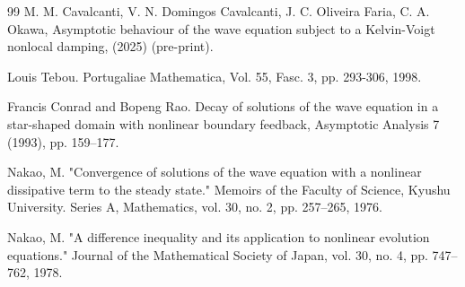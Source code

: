 \documentclass[11pt,reqno]{amsart}
\theoremstyle{remark}
\begin{document}
\begin{thebibliography}{99}
 M. M. Cavalcanti, V. N. Domingos Cavalcanti, J. C. Oliveira Faria, C. A. Okawa, Asymptotic behaviour of the wave equation subject to a Kelvin-Voigt nonlocal damping, (2025) (pre-print).

 Louis Tebou. Portugaliae Mathematica, Vol. 55, Fasc. 3, pp. 293-306, 1998.

 Francis Conrad and Bopeng Rao. Decay of solutions of the wave equation in a star-shaped domain with nonlinear boundary feedback, Asymptotic Analysis 7 (1993), pp. 159–177.

 Nakao, M. "Convergence of solutions of the wave equation with a nonlinear dissipative term to the steady state." Memoirs of the Faculty of Science, Kyushu University. Series A, Mathematics, vol. 30, no. 2, pp. 257–265, 1976.

 Nakao, M. "A difference inequality and its application to nonlinear evolution equations." Journal of the Mathematical Society of Japan, vol. 30, no. 4, pp. 747–762, 1978.

\end{thebibliography}
\end{document}
